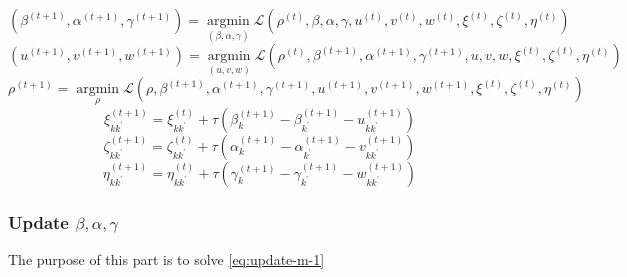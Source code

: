 \documentclass[12pt, a4paper, oneside]{article}
\numberwithin{equation}{section}
\begin{document}
\begin{equation}
	\label{eq:update-m-1}
	(\beta^{(t+1)},\alpha^{(t+1)}, \gamma^{(t+1)}) = \mathop{\arg\min}\limits_{(\beta, \alpha, \gamma)} \mathcal{L}(\rho^{(t)}, \beta, \alpha, \gamma, u^{(t)}, v^{(t)}, w^{(t)}, \xi^{(t)}, \zeta^{(t)}, \eta^{(t)})
\end{equation}
\begin{equation}
	\label{eq:update-m-2}
	(u^{(t+1)},v^{(t+1)}, w^{(t+1)}) = \mathop{\arg\min}\limits_{(u,v,w)} \mathcal{L}(\rho^{(t)}, \beta^{(t+1)}, \alpha^{(t+1)}, \gamma^{(t+1)}, u, v, w, \xi^{(t)}, \zeta^{(t)}, \eta^{(t)})
\end{equation}
\begin{equation}
	\label{eq:update-m-rho}
	\rho^{(t+1)} = \mathop{\arg\min}\limits_{\rho} \mathcal{L}(\rho, \beta^{(t+1)}, \alpha^{(t+1)}, \gamma^{(t+1)}, u^{(t+1)}, v^{(t+1)}, w^{(t+1)}, \xi^{(t)}, \zeta^{(t)}, \eta^{(t)})
\end{equation}
\begin{equation}
	\label{eq:update-m-3}
	\xi_{k{k^\prime}}^{(t+1)}=\xi_{k{k^\prime}}^{(t)}+\tau\left(\beta_{k}^{(t+1)}-\beta_{k^\prime}^{(t+1)}-u_{k{k^\prime}}^{(t+1)}\right)
\end{equation}
\begin{equation}
	\label{eq:update-m-4}
	\zeta_{k{k^\prime}}^{(t+1)}=\zeta_{k{k^\prime}}^{(t)}+\tau\left(\alpha_{k}^{(t+1)}-\alpha_{k^\prime}^{(t+1)}-v_{k{k^\prime}}^{(t+1)}\right)
\end{equation}
\begin{equation}
	\label{eq:update-m-5}
	\eta_{k{k^\prime}}^{(t+1)}=\eta_{k{k^\prime}}^{(t)}+\tau\left(\gamma_{k}^{(t+1)}-\gamma_{k^\prime}^{(t+1)}-w_{k{k^\prime}}^{(t+1)}\right)
\end{equation}

\subsubsection{Update $\beta, \alpha, \gamma$} 
The purpose of this part is to solve \ref{eq:update-m-1}
\end{document}
